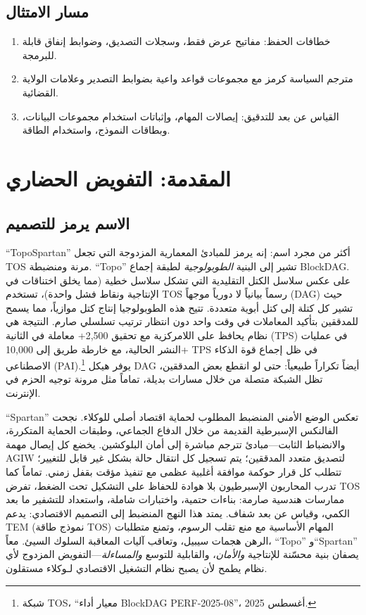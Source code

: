 \documentclass[11pt]{article}
\begin{document}
\subsection{مسار الامتثال}
\begin{enumerate}[noitemsep]
  \item خطافات الحفظ: مفاتيح عرض فقط، وسجلات التصديق، وضوابط إنفاق قابلة للبرمجة.
  \item مترجم السياسة كرمز مع مجموعات قواعد واعية بضوابط التصدير وعلامات الولاية القضائية.
  \item القياس عن بعد للتدقيق: إيصالات المهام، وإثباتات استخدام مجموعات البيانات، وبطاقات النموذج، واستخدام الطاقة.
\end{enumerate}

\section{المقدمة: التفويض الحضاري}
\subsection{الاسم يرمز للتصميم}
``TopoSpartan'' أكثر من مجرد اسم: إنه يرمز للمبادئ المعمارية المزدوجة التي تجعل TOS مرنة ومنضبطة. ``Topo'' تشير إلى البنية \emph{الطوبولوجية} لطبقة إجماع BlockDAG. على عكس سلاسل الكتل التقليدية التي تشكل سلاسل خطية (مما يخلق اختناقات في الإنتاجية ونقاط فشل واحدة)، تستخدم TOS رسماً بيانياً لا دورياً موجهاً (DAG) حيث تشير كل كتلة إلى كتل أبوية متعددة. تتيح هذه الطوبولوجيا إنتاج كتل موازياً، مما يسمح للمدققين بتأكيد المعاملات في وقت واحد دون انتظار ترتيب تسلسلي صارم. النتيجة هي نظام يحافظ على اللامركزية مع تحقيق 2,500+ معاملة في الثانية (TPS) في عمليات النشر الحالية، مع خارطة طريق إلى 10,000+ TPS في ظل إجماع قوة الذكاء الاصطناعي (PAI).\footnote{شبكة TOS، ``معيار أداء BlockDAG PERF-2025-08''، أغسطس 2025.} يوفر هيكل DAG أيضاً تكراراً طبيعياً: حتى لو انقطع بعض المدققين، تظل الشبكة متصلة من خلال مسارات بديلة، تماماً مثل مرونة توجيه الحزم في الإنترنت.

``Spartan'' تعكس الوضع الأمني المنضبط المطلوب لحماية اقتصاد أصلي للوكلاء. نجحت الفالنكس الإسبرطية القديمة من خلال الدفاع الجماعي، وطبقات الحماية المتكررة، والانضباط الثابت---مبادئ تترجم مباشرة إلى أمان البلوكشين. يخضع كل إيصال مهمة AGIW لتصديق متعدد المدققين؛ يتم تسجيل كل انتقال حالة بشكل غير قابل للتغيير؛ تتطلب كل قرار حوكمة موافقة أغلبية عظمى مع تنفيذ مؤقت بقفل زمني. تماماً كما تدرب المحاربون الإسبرطيون بلا هوادة للحفاظ على التشكيل تحت الضغط، تفرض TOS ممارسات هندسية صارمة: بناءات حتمية، واختبارات شاملة، واستعداد للتشفير ما بعد الكمي، وقياس عن بعد شفاف. يمتد هذا النهج المنضبط إلى التصميم الاقتصادي: يدعم TEM (نموذج طاقة TOS) المهام الأساسية مع منع تقلب الرسوم، وتمنع متطلبات الرهن هجمات سيبيل، وتعاقب آليات المعاقبة السلوك السيئ. معاً، ``Topo'' و``Spartan'' يصفان بنية محسّنة للإنتاجية \emph{والأمان}، والقابلية للتوسع \emph{والمساءلة}---التفويض المزدوج لأي نظام يطمح لأن يصبح نظام التشغيل الاقتصادي لـوكلاء مستقلون.
\end{document}
